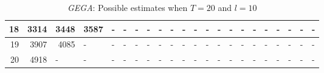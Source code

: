 \begin{appendices}
\begin{table}[H]
\begin{minipage}[b]{18.5cm}
\begin{turn}{-90}
{\begin{tabular}{|r|r|r|r|r|r|r|r|r|r|r|r|l|l|l|l|l|l|l|l|l|l|}
18 & 3314 & 3448 & 3587 & \multicolumn{1}{l|}{-} & \multicolumn{1}{l|}{-} & \multicolumn{1}{l|}{-} & \multicolumn{1}{l|}{-} & \multicolumn{1}{l|}{-} & \multicolumn{1}{l|}{-} & \multicolumn{1}{l|}{-} & \multicolumn{1}{l|}{-} & - & - & - & - & - & - & - & - & - & - \\ \hline
19 & 3907 & 4085 & \multicolumn{1}{l|}{-} & \multicolumn{1}{l|}{-} & \multicolumn{1}{l|}{-} & \multicolumn{1}{l|}{-} & \multicolumn{1}{l|}{-} & \multicolumn{1}{l|}{-} & \multicolumn{1}{l|}{-} & \multicolumn{1}{l|}{-} & \multicolumn{1}{l|}{-} & - & - & - & - & - & - & - & - & - & - \\ \hline
20 & 4918 & \multicolumn{1}{l|}{-} & \multicolumn{1}{l|}{-} & \multicolumn{1}{l|}{-} & \multicolumn{1}{l|}{-} & \multicolumn{1}{l|}{-} & \multicolumn{1}{l|}{-} & \multicolumn{1}{l|}{-} & \multicolumn{1}{l|}{-} & \multicolumn{1}{l|}{-} & \multicolumn{1}{l|}{-} & - & - & - & - & - & - & - & - & - & - \\ \hline
\end{tabular}
}
\end{turn}
\caption{\emph{GEGA}: Possible estimates when $T=20$ and $l=10$}
 \end{minipage}
 \end{table}



\end{appendices}
